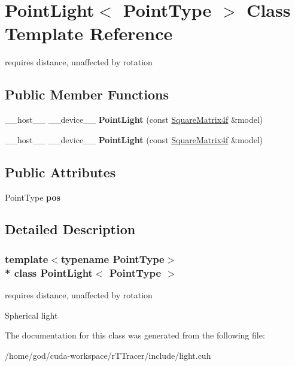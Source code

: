 \hypertarget{class_point_light}{}\section{Point\+Light$<$ Point\+Type $>$ Class Template Reference}
\label{class_point_light}


requires distance, unaffected by rotation  


\subsection*{Public Member Functions}
\begin{DoxyCompactItemize}
\item 
\+\_\+\+\_\+host\+\_\+\+\_\+ \+\_\+\+\_\+device\+\_\+\+\_\+ {\bfseries Point\+Light} (const \hyperlink{class_square_matrix4}{Square\+Matrix4f} \&model)\hypertarget{class_point_light_a01fae78fac3286f01acead5ad0dadf8b}{}\label{class_point_light_a01fae78fac3286f01acead5ad0dadf8b}

\item 
\+\_\+\+\_\+host\+\_\+\+\_\+ \+\_\+\+\_\+device\+\_\+\+\_\+ {\bfseries Point\+Light} (const \hyperlink{class_square_matrix4}{Square\+Matrix4f} \&model)\hypertarget{class_point_light_a01fae78fac3286f01acead5ad0dadf8b}{}\label{class_point_light_a01fae78fac3286f01acead5ad0dadf8b}

\end{DoxyCompactItemize}
\subsection*{Public Attributes}
\begin{DoxyCompactItemize}
\item 
Point\+Type {\bfseries pos}\hypertarget{class_point_light_a5546247e7a8ccc1ff713898703f1db07}{}\label{class_point_light_a5546247e7a8ccc1ff713898703f1db07}

\end{DoxyCompactItemize}


\subsection{Detailed Description}
\subsubsection*{template$<$typename Point\+Type$>$\\*
class Point\+Light$<$ Point\+Type $>$}

requires distance, unaffected by rotation 

Spherical light 

The documentation for this class was generated from the following file\+:\begin{DoxyCompactItemize}
\item 
/home/god/cuda-\/workspace/r\+T\+Tracer/include/light.\+cuh\end{DoxyCompactItemize}
